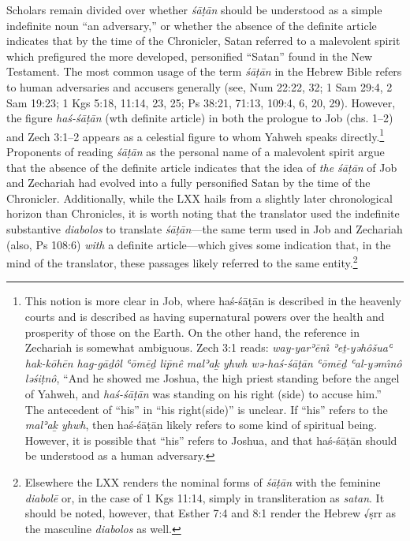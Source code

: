 Scholars remain divided over whether \emph{śāṭān} should be understood
as a simple indefinite noun ``an adversary,''
\autocites{stokes_jbl2009}[114--117]{japhet2009}[370--390]{japhet1993}
or whether the absence of the definite article indicates that by the
time of the Chronicler, Satan referred to a malevolent spirit which
prefigured the more developed, personified ``Satan'' found in the New
Testament.\autocite[4--5]{rollston_keith-stuckenbruck2016} The most
common usage of the term \emph{śāṭān} in the Hebrew Bible refers to
human adversaries and accusers generally (see, Num 22:22, 32; 1 Sam
29:4, 2 Sam 19:23; 1 Kgs 5:18, 11:14, 23, 25; Ps 38:21, 71:13, 109:4, 6,
20, 29). However, the figure \emph{haś-śāṭān} (wth definite article) in
both the prologue to Job (chs. 1--2) and Zech 3:1--2 appears as a
celestial figure to whom Yahweh speaks directly.\footnote{This notion is
  more clear in Job, where haś-śāṭān is described in the heavenly courts
  and is described as having supernatural powers over the health and
  prosperity of those on the Earth. On the other hand, the reference in
  Zechariah is somewhat ambiguous. Zech 3:1 reads: \emph{way-yarʾēnı̂
  ʾeṯ-yəhôšuaʿ hak-kōhēn hag-gāḏôl ʿōmēḏ lip̄nê malʾaḵ yhwh wə-haś-śāṭān
  ʿōmēḏ ʿal-yəmı̂nô ləśiṭnô}, ``And he showed me Joshua, the high priest
  standing before the angel of Yahweh, and \emph{haś-śāṭān} was standing
  on his right (side) to accuse him.'' The antecedent of ``his'' in
  ``his right(side)'' is unclear. If ``his'' refers to the \emph{malʾaḵ
  yhwh}, then haś-śāṭān likely refers to some kind of spiritual being.
  However, it is possible that ``his'' refers to Joshua, and that
  haś-śāṭān should be understood as a human adversary.} Proponents of
reading \emph{śāṭān} as the personal name of a malevolent spirit argue
that the absence of the definite article indicates that the idea of
\emph{the śāṭān} of Job and Zechariah had evolved into a fully
personified Satan by the time of the
Chronicler.\autocites[216--217]{braun1986}[107]{coggins1976}[Rollston
also finds this reading compelling, though, not without difficulties.
See,][4--5]{rollston_keith-stuckenbruck2016} Additionally, while the LXX
hails from a slightly later chronological horizon than Chronicles, it is
worth noting that the translator used the indefinite substantive
\emph{diabolos} to translate \emph{śāṭān}---the same term used in Job
and Zechariah (also, Ps 108:6) \emph{with} a definite article---which
gives some indication that, in the mind of the translator, these
passages likely referred to the same entity.\footnote{Elsewhere the LXX
  renders the nominal forms of \emph{śāṭān} with the feminine
  \emph{diabolē} or, in the case of 1 Kgs 11:14, simply in
  transliteration as \emph{satan}. It should be noted, however, that
  Esther 7:4 and 8:1 render the Hebrew √ṣrr as the masculine
  \emph{diabolos} as well.}

